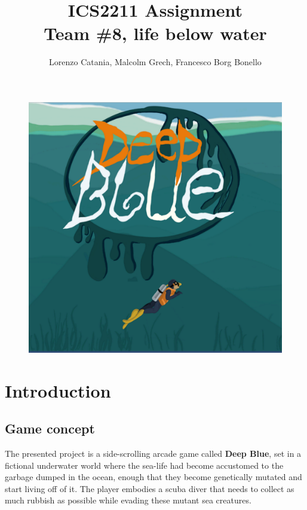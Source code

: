 \documentclass[11pt]{article}
\title{
  ICS2211 Assignment \\
  \large Team \#8, life below water
}
\author{Lorenzo Catania, Malcolm Grech, Francesco Borg Bonello}
\begin{document}
\begin{titlepage}
\begin{figure}
  \centering
  \includegraphics[width=1.0\textwidth]{figures/frontpage}
\end{figure}
\end{titlepage}

\maketitle

{
  \hypersetup{linkcolor=black}
  \tableofcontents
}

\section{Introduction}
\subsection{Game concept}
The presented project is a side-scrolling arcade game called \textbf{Deep Blue}, set in a fictional underwater world where the sea-life had become accustomed to the garbage dumped in the ocean, enough that they become genetically mutated and start living off of it. The player embodies a scuba diver that needs to collect as much rubbish as possible while evading these mutant sea creatures.
\end{document}
